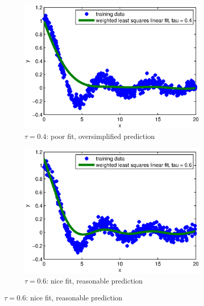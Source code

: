 \documentclass{article}
\begin{document}
	\begin{figure}
		\centering
		\begin{subfigure}{.5\textwidth}
			\centering
			\includegraphics[width=.9\linewidth]{LWR-0-4.eps}
			\caption{$\tau = 0.4$: poor fit, oversimplified prediction}
			\label{fig:sub1}
		\end{subfigure}%
		\begin{subfigure}{.5\textwidth}
			\centering
			\includegraphics[width=.9\linewidth]{LWR-0-6.eps}
			\caption{$\tau = 0.6$: nice fit, reasonable prediction}
			\label{fig:sub2}
		\end{subfigure}
	\end{figure}	
\end{document}
